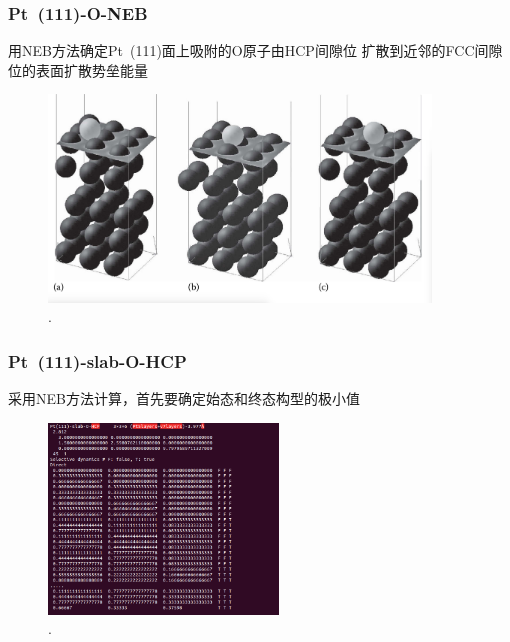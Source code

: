 {
	\frametitle{\textrm{Pt~(111)-O-NEB}}
	用\textrm{NEB}方法确定\textrm{Pt~(111)}面上吸附的\textrm{O}原子由\textrm{HCP}间隙位%
	扩散到近邻的\textrm{FCC}间隙位的表面扩散势垒能量%
\begin{figure}[h!]
\centering
\includegraphics[width=4.0in,viewport=0 10 1040 530,clip]{Figures/Pt_NEB-config.png}
\caption{\fontsize{6.2pt}{5.2pt}.}%
\label{Pt_NEB-config}
\end{figure} 
}

\frame
{
	\frametitle{\textrm{Pt~(111)-slab-O-HCP}}
采用\textrm{NEB}方法计算，首先要确定始态和终态构型的极小值%
\begin{figure}[h!]
	\vskip -8pt
\centering
\includegraphics[height=2.0in,viewport=0 5 470 500,clip]{Figures/Pt_NEB-init-POSCAR.png}
\caption{\fontsize{6.2pt}{5.2pt}.}%
\label{Pt_NEB-init-POSCAR}
\end{figure}
{\fontsize{7.2pt}{5.2pt}}
}

